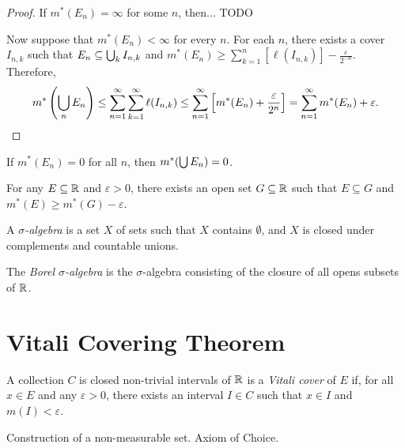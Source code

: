 \begin{proof}
    If $m^{*}(E_n) = \infty$ for some $n$, then... {\color{red}TODO}

    Now suppose that $m^{*}(E_n) < \infty$ for every $n$. For each $n$, there exists a cover $I_{n,k}$ such that $E_n \subseteq \bigcup_{k}I_{n, k}$ and $m^{*}(E_n) \geq \sum_{k=1}^{n}\left[\ell(I_{n,k})\right] - \frac{\varepsilon}{2^{-n}}$. Therefore,
    \begin{align*}
        m^{*}\left(\bigcup_{n}E_n\right) \leq \sum_{n=1}^{\infty}\sum_{k=1}^{\infty}\ell(I_{n,k}) \leq \sum_{n=1}^{\infty}\left[m^{*}(E_n) + \frac{\varepsilon}{2^{n}}\right] = \sum_{n=1}^{\infty}m^{*}(E_n) + \varepsilon.
    \end{align*}
\end{proof}

\begin{cor}
    If $m^{*}(E_n) = 0$ for all $n$, then $m^{*}(\bigcup E_n) = 0$.
\end{cor}

\begin{cor}
    For any $E \subseteq \mathbb{R}$ and $\varepsilon > 0$, there exists an open set $G \subseteq \mathbb{R}$ such that $E \subseteq G$ and $m^{*}(E) \geq m^{*}(G) - \varepsilon$.
\end{cor}

\begin{defn}
    A \emph{$\sigma$-algebra} is a set $X$ of sets such that $X$ contains $\emptyset$, and $X$ is closed under complements and countable unions.
\end{defn}

\begin{defn}
    The \emph{Borel $\sigma$-algebra} is the $\sigma$-algebra consisting of the closure of all opens subsets of $\mathbb{R}$.
\end{defn}

\section{Vitali Covering Theorem}

\begin{defn}
    A collection $C$ is closed non-trivial intervals of $\mathbb{R}$ is a \emph{Vitali cover} of $E$ if, for all $x \in E$ and any $\varepsilon > 0$, there exists an interval $I \in C$ such that $x \in I$ and $m(I) < \varepsilon$.
\end{defn}

Construction of a non-measurable set. Axiom of Choice.

